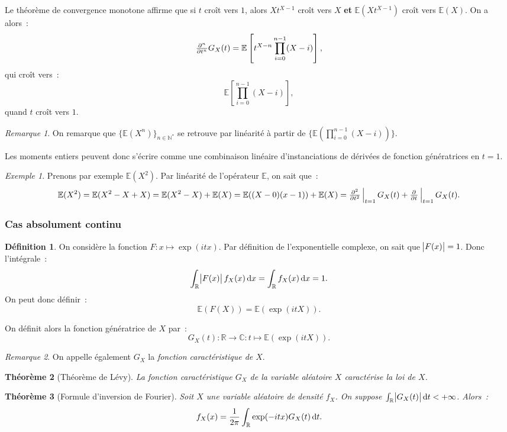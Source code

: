 \documentclass{article}
\newcommand{\C}{\mathbb C}
\newcommand{\E}{\mathbb E}
\newcommand{\N}{\mathbb N}
\newcommand{\R}{\mathbb R}
\newcommand{\evpd}[2]{\pd {}{#1}\sVert[2]_{#1=#2}}  %
\newcommand{\evipd}[3][i]{\pd[#1] {}{#2}\sVert[2]_{#2=#3}}  %
\newtheorem{thm}{Théorème}[section]
\theoremstyle{definition}
\newtheorem{déf}[thm]{Définition}
\theoremstyle{remark}
\newtheorem*{rmq}{Remarque}
\newtheorem{ex}{Exemple}
\begin{document}
		Le théorème de convergence monotone affirme que si $t$ croît vers $1$, alors $Xt^{X-1}$ croît vers $X$ \textbf{et} $\E(Xt^{X-1})$ croît vers $\E(X)$.
		On a alors~:
		\[\pd[n] {}tG_X(t) = \E\left[t^{X-n}\prod_{i=0}^{n-1}(X-i)\right],\]
		qui croît vers~:
		\[\E\left[\prod_{i=0}^{n-1}(X-i)\right],\]
		quand $t$ croît vers $1$.

		\begin{rmq} On remarque que $\{\E(X^n)\}_{n \in \N^*}$ se retrouve par linéarité à partir de $\{\E\left(\prod_{i=0}^{n-1}(X-i)\right)\}$.
		
		Les moments entiers peuvent donc s'écrire comme une combinaison linéaire d'instanciations de dérivées de fonction génératrices en $t=1$. \end{rmq}

		\begin{ex} Prenons par exemple $\E(X^2)$. Par linéarité de l'opérateur $\E$, on sait que~:
		\[\E(X^2) = \E(X^2 - X + X) = \E(X^2-X) + \E(X) = \E((X-0)(x-1)) + \E(X) = \evipd[2] t1G_X(t) + \evpd t1G_X(t).\]
		\end{ex}

		\subsubsection{Cas absolument continu}
		\begin{déf} On considère la fonction $F : x \mapsto \exp(itx)$. Par définition de l'exponentielle complexe, on sait que $\abs {F(x)} = 1$.
		Donc l'intégrale~:
		\[\int_\R \abs{F(x)}f_X(x)\dif x = \int_\R f_X(x)\dif x = 1.\]
		On peut donc définir~:
		\[\E(F(X)) = \E(\exp(itX)).\]

		On définit alors la fonction génératrice de $X$ par~:
		\[G_X(t) : \R \to \C : t \mapsto \E(\exp(itX)).\]
		\end{déf}

		\begin{rmq} On appelle également $G_X$ la \emph{fonction caractéristique de $X$}. \end{rmq}

		\begin{thm}[Théorème de Lévy] La fonction caractéristique $G_X$ de la variable aléatoire $X$ caractérise la loi de $X$. \end{thm}

		\begin{thm}[Formule d'inversion de Fourier] Soit $X$ une variable aléatoire de densité $f_X$. On suppose $\int_\R \abs {G_X(t)}\dif t < +\infty$. Alors~:
		\[f_X(x) = \frac 1{2\pi}\int_\R\exp(-itx)G_X(t)\dif t.\]
		\end{thm}
\end{document}
